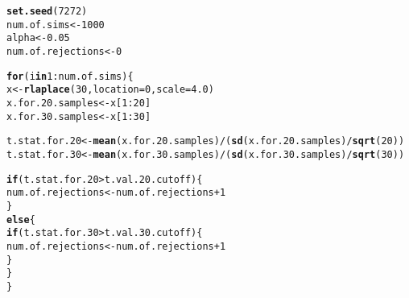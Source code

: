 \documentclass{article}\usepackage[]{graphicx}\usepackage[]{xcolor}
\makeatletter
\newcommand{\hlnum}[1]{\textcolor[rgb]{0.686,0.059,0.569}{#1}}%
\newcommand{\hlopt}[1]{\textcolor[rgb]{0,0,0}{#1}}%
\newcommand{\hldef}[1]{\textcolor[rgb]{0.345,0.345,0.345}{#1}}%
\newcommand{\hlkwa}[1]{\textcolor[rgb]{0.161,0.373,0.58}{\textbf{#1}}}%
\newcommand{\hlkwb}[1]{\textcolor[rgb]{0.69,0.353,0.396}{#1}}%
\newcommand{\hlkwc}[1]{\textcolor[rgb]{0.333,0.667,0.333}{#1}}%
\newcommand{\hlkwd}[1]{\textcolor[rgb]{0.737,0.353,0.396}{\textbf{#1}}}%
\newenvironment{kframe}{%
 \def\at@end@of@kframe{}%
 \ifinner\ifhmode%
  \def\at@end@of@kframe{\end{minipage}}%
  \begin{minipage}{\columnwidth}%
 \fi\fi%
 \def\FrameCommand##1{\hskip\@totalleftmargin \hskip-\fboxsep
 \colorbox{shadecolor}{##1}\hskip-\fboxsep
     \hskip-\linewidth \hskip-\@totalleftmargin \hskip\columnwidth}%
 \MakeFramed {\advance\hsize-\width
   \@totalleftmargin\z@ \linewidth\hsize
   \@setminipage}}%
 {\par\unskip\endMakeFramed%
 \at@end@of@kframe}
\newenvironment{knitrout}{}{} %
\makeatother
\begin{document}
\begin{enumerate}
\begin{enumerate}
\begin{knitrout}
\begin{kframe}
{\ttfamily\noindent\itshape\color{messagecolor}{\#\# Loading required package: splines}}\begin{alltt}
\hlkwd{set.seed}\hldef{(}\hlnum{7272}\hldef{)}
\hldef{num.of.sims} \hlkwb{<-} \hlnum{1000}
\hldef{alpha} \hlkwb{<-} \hlnum{0.05}
\hldef{num.of.rejections} \hlkwb{<-} \hlnum{0}

\hlkwa{for} \hldef{(i} \hlkwa{in} \hlnum{1}\hlopt{:}\hldef{num.of.sims)\{}
  \hldef{x} \hlkwb{<-} \hlkwd{rlaplace}\hldef{(}\hlnum{30}\hldef{,}\hlkwc{location} \hldef{=} \hlnum{0}\hldef{,}\hlkwc{scale} \hldef{=} \hlnum{4.0}\hldef{)}
  \hldef{x.for.20.samples} \hlkwb{<-} \hldef{x[}\hlnum{1}\hlopt{:}\hlnum{20}\hldef{]}
  \hldef{x.for.30.samples} \hlkwb{<-} \hldef{x[}\hlnum{1}\hlopt{:}\hlnum{30}\hldef{]}

  \hldef{t.stat.for.20} \hlkwb{<-} \hlkwd{mean}\hldef{(x.for.20.samples)}\hlopt{/} \hldef{(}\hlkwd{sd}\hldef{(x.for.20.samples)}\hlopt{/} \hlkwd{sqrt}\hldef{(}\hlnum{20}\hldef{))}
  \hldef{t.stat.for.30} \hlkwb{<-} \hlkwd{mean}\hldef{(x.for.30.samples)}\hlopt{/} \hldef{(}\hlkwd{sd}\hldef{(x.for.30.samples)}\hlopt{/} \hlkwd{sqrt}\hldef{(}\hlnum{30}\hldef{))}

  \hlkwa{if} \hldef{(t.stat.for.20} \hlopt{>} \hldef{t.val.20.cutoff)\{}
    \hldef{num.of.rejections} \hlkwb{<-} \hldef{num.of.rejections} \hlopt{+} \hlnum{1}
  \hldef{\}}
  \hlkwa{else}\hldef{\{}
    \hlkwa{if} \hldef{(t.stat.for.30} \hlopt{>} \hldef{t.val.30.cutoff)\{}
      \hldef{num.of.rejections} \hlkwb{<-} \hldef{num.of.rejections} \hlopt{+} \hlnum{1}
    \hldef{\}}
  \hldef{\}}
\hldef{\}}


\end{alltt}
\end{kframe}
\end{knitrout}
\end{enumerate}
\end{enumerate}
\end{document}
